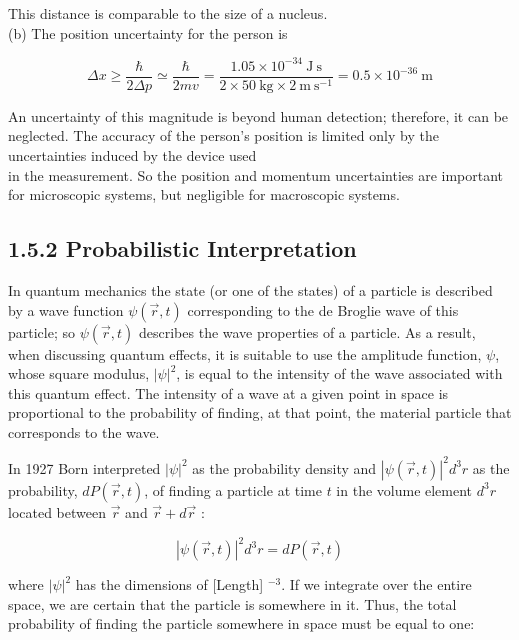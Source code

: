 \documentclass[10pt]{article}
\begin{document}
This distance is comparable to the size of a nucleus.\\
(b) The position uncertainty for the person is


\begin{equation*}
\Delta x \geq \frac{\hbar}{2 \Delta p} \simeq \frac{\hbar}{2 m v}=\frac{1.05 \times 10^{-34} \mathrm{~J} \mathrm{~s}}{2 \times 50 \mathrm{~kg} \times 2 \mathrm{~m} \mathrm{~s}^{-1}}=0.5 \times 10^{-36} \mathrm{~m} \tag{1.60}
\end{equation*}


An uncertainty of this magnitude is beyond human detection; therefore, it can be neglected. The accuracy of the person's position is limited only by the uncertainties induced by the device used\\
in the measurement. So the position and momentum uncertainties are important for microscopic systems, but negligible for macroscopic systems.

\subsection*{1.5.2 Probabilistic Interpretation}
In quantum mechanics the state (or one of the states) of a particle is described by a wave function $\psi(\vec{r}, t)$ corresponding to the de Broglie wave of this particle; so $\psi(\vec{r}, t)$ describes the wave properties of a particle. As a result, when discussing quantum effects, it is suitable to use the amplitude function, $\psi$, whose square modulus, $|\psi|^{2}$, is equal to the intensity of the wave associated with this quantum effect. The intensity of a wave at a given point in space is proportional to the probability of finding, at that point, the material particle that corresponds to the wave.

In 1927 Born interpreted $|\psi|^{2}$ as the probability density and $|\psi(\vec{r}, t)|^{2} d^{3} r$ as the probability, $d P(\vec{r}, t)$, of finding a particle at time $t$ in the volume element $d^{3} r$ located between $\vec{r}$ and $\vec{r}+d \vec{r}$ :


\begin{equation*}
|\psi(\vec{r}, t)|^{2} d^{3} r=d P(\vec{r}, t) \tag{1.61}
\end{equation*}


where $|\psi|^{2}$ has the dimensions of [Length] ${ }^{-3}$. If we integrate over the entire space, we are certain that the particle is somewhere in it. Thus, the total probability of finding the particle somewhere in space must be equal to one:
\end{document}
